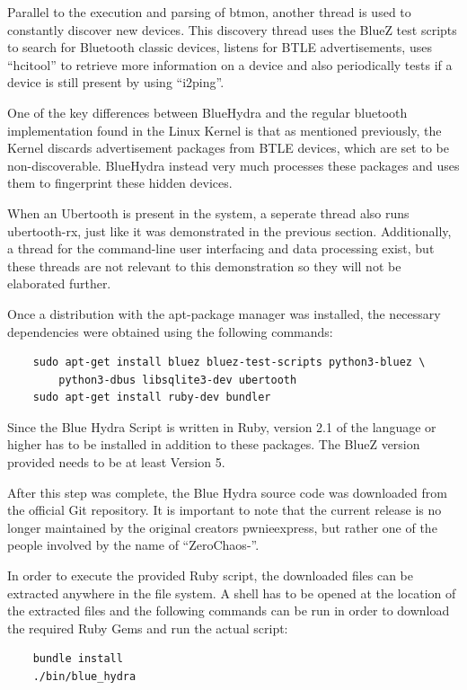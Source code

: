 \begin{itemize}
Parallel to the execution and parsing of btmon, another thread is used to constantly discover new devices. This discovery thread uses the BlueZ test scripts to search for Bluetooth classic devices, listens for BTLE advertisements, uses ``hcitool'' to retrieve more information on a device and also periodically tests if a device is still present by using ``i2ping''.

One of the key differences between BlueHydra and the regular bluetooth implementation found in the Linux Kernel is that as mentioned previously, the Kernel discards advertisement packages from BTLE devices, which are set to be non-discoverable. BlueHydra instead very much processes these packages and uses them to fingerprint these hidden devices.

When an Ubertooth is present in the system, a seperate thread also runs ubertooth-rx, just like it was demonstrated in the previous section. Additionally, a thread for the command-line user interfacing and data processing exist, but these threads are not relevant to this demonstration so they will not be elaborated further.


Once a distribution with the apt-package manager was installed, the necessary dependencies were obtained using the following commands:

\begin{verbatim}
    sudo apt-get install bluez bluez-test-scripts python3-bluez \
        python3-dbus libsqlite3-dev ubertooth
    sudo apt-get install ruby-dev bundler
\end{verbatim}

Since the Blue Hydra Script is written in Ruby, version 2.1 of the language or higher has to be installed in addition to these packages. The BlueZ version provided needs to be at least Version 5.

After this step was complete, the Blue Hydra source code was downloaded from the official Git repository. It is important to note that the current release is no longer maintained by the original creators pwnieexpress, but rather one of the people involved by the name of ``ZeroChaos-''.

In order to execute the provided Ruby script, the downloaded files can be extracted anywhere in the file system. A shell has to be opened at the location of the extracted files and the following commands can be run in order to download the required Ruby Gems and run the actual script:

\begin{verbatim}
    bundle install
    ./bin/blue_hydra
\end{verbatim}


\end{itemize}
